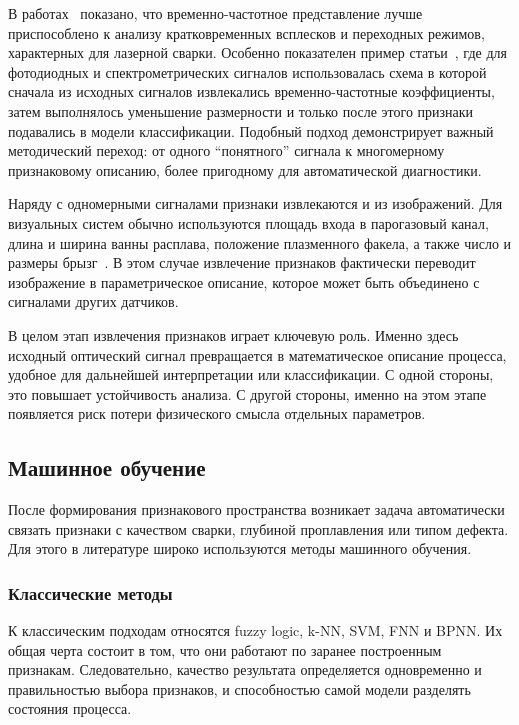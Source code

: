 В работах~\cite{fang2004wavelet,sibillano2010plasma,vakili2017wavelet} показано, что временно-частотное представление лучше приспособлено к анализу кратковременных всплесков и переходных режимов, характерных для лазерной сварки. Особенно показателен пример статьи~\cite{6803929}, где для фотодиодных и спектрометрических сигналов использовалась схема в которой сначала из исходных сигналов извлекались временно-частотные коэффициенты, затем выполнялось уменьшение размерности и только после этого признаки подавались в модели классификации. Подобный подход демонстрирует важный методический переход: от одного ``понятного'' сигнала к многомерному признаковому описанию, более пригодному для автоматической диагностики.

Наряду с одномерными сигналами признаки извлекаются и из изображений. Для визуальных систем обычно используются площадь входа в парогазовый канал, длина и ширина ванны расплава, положение плазменного факела, а также число и размеры брызг~\cite{wang2020monitoring,ZHANG2019671,wu2020visual}. В этом случае извлечение признаков фактически переводит изображение в параметрическое описание, которое может быть объединено с сигналами других датчиков.

В целом этап извлечения признаков играет ключевую роль. Именно здесь исходный оптический сигнал превращается в математическое описание процесса, удобное для дальнейшей интерпретации или классификации. С одной стороны, это повышает устойчивость анализа. С другой стороны, именно на этом этапе появляется риск потери физического смысла отдельных параметров.

\subsection{Машинное обучение}

После формирования признакового пространства возникает задача автоматически связать признаки с качеством сварки, глубиной проплавления или типом дефекта. Для этого в литературе широко используются методы машинного обучения.

\subsubsection{Классические методы}

К классическим подходам относятся fuzzy logic, k-NN, SVM, FNN и BPNN. Их общая черта состоит в том, что они работают по заранее построенным признакам. Следовательно, качество результата определяется одновременно и правильностью выбора признаков, и способностью самой модели разделять состояния процесса.

